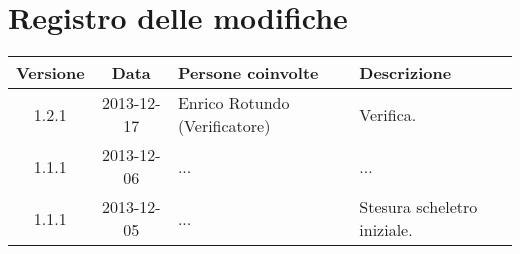\section*{Registro delle modifiche}

\small{
\begin{tabularx}{\textwidth}{|c|c|l|X|}
 \hline \textbf{Versione} & \textbf{Data} & \textbf{Persone coinvolte} & \textbf{Descrizione} \\

 
 \hline 1.2.1 & 2013-12-17 & Enrico Rotundo (Verificatore) & Verifica. \\

 \hline 1.1.1 & 2013-12-06 & ... &
 ... \\

 \hline 1.1.1 & 2013-12-05 & ... &
 Stesura scheletro iniziale. \\

 \hline
\end{tabularx}
}
